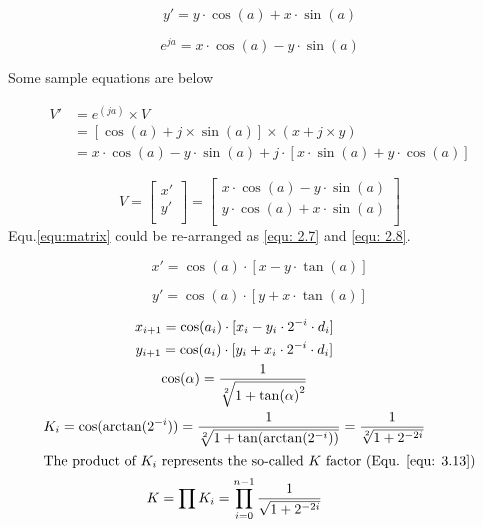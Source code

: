 {\begin{equation} \label{Equ.2.1}
y'=y\cdot\cos{(a)}+x\cdot\sin{(a)}
\end{equation}

\begin{equation} \label{Equ.2.2}
e^{ja}=x\cdot\cos{(a)}-y\cdot\sin{(a)}
\end{equation}

Some sample equations are below


\begin{align}
V' &=e^{(ja)}\times V \label{Equ.3.3}\\
&=[\cos(a) + j \times \sin(a)] \times (x+j \times y) \label{Equ.3.4}\\
&=x \cdot \cos(a) - y\cdot \sin(a) + j \cdot [x \cdot \sin(a) + y \cdot     \cos(a)] \label{Equ.3.5}
\end{align}


\begin{equation}
\label{equ:matrix}
V=
\begin{bmatrix}
x'\\
y'\\
\end{bmatrix}=
\begin{bmatrix}
x \cdot \cos(a) - y \cdot \sin(a)\\
y \cdot \cos(a) + x \cdot \sin(a)\\
\end{bmatrix}
\end{equation}
Equ.\ref{equ:matrix} could be re-arranged as \ref{equ: 2.7} and  \ref{equ: 2.8}.

\begin{equation} 
\label{equ: 2.7}
x'=\cos(a) \cdot[x-y\cdot\tan(a)]
\end{equation}

\begin{equation} 
\label{equ: 2.8}
y'=\cos(a) \cdot [y+x \cdot \tan(a)]
\end{equation}



\begin{gather} 
x_{i+1}=\cos(a_i) \cdot [x_i-y_i \cdot 2^{-i} \cdot d_i] \label{Equ. 3.9}\\
y_{i+1}=\cos(a_i) \cdot [y_i+x_i \cdot 2^{-i} \cdot d_i] \label{Equ. 3.10}\\
\cos(\alpha)=\dfrac{1}{\sqrt [2]{1+{\tan(\alpha)}^2}}
 \label{Equ. 3.11} \\
K_i=\cos(\arctan(2^{-i}))= \dfrac{1}{\sqrt [2]{1+\tan(\arctan(2^{-   i}))}}=\dfrac{1}{\sqrt[2]{1+2^{-2i}}}
\label{Equ. 3.12}\\
\intertext{The product of $K_i$  represents the so-called $K$ factor (Equ. \ref{equ: 3.13})}
K=\prod K_i=\prod_{i=0}^{n-1} \dfrac{1}{\sqrt{1+2^{-2i}}}
\label{equ: 3.13}
\end{gather}


}
